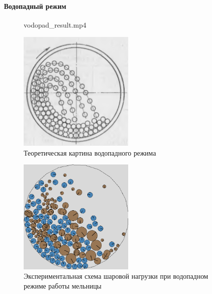 \documentclass[c]{beamer}  %
\begin{document}
\begin{frame}
\frametitle{\insertsection} 
\framesubtitle{Водопадный режим}

\begin{figure}[ht]
     		{vodopad_result.mp4}
\end{figure}
{
\begin{figure}[H]
	\centering
	\includegraphics[width=0.5\textwidth]{vodopad_theory} 
	\caption{Теоретическая картина водопадного режима}
\end{figure}
}
{
\begin{figure}[H]
	\centering
	\includegraphics[width=0.5\textwidth]{vodopad_result} 
	\caption{Экспериментальная схема шаровой нагрузки при водопадном режиме работы мельницы}
	\label{pic:vodopad_result}
\end{figure} 
}
{

}

\end{frame}
\end{document}
